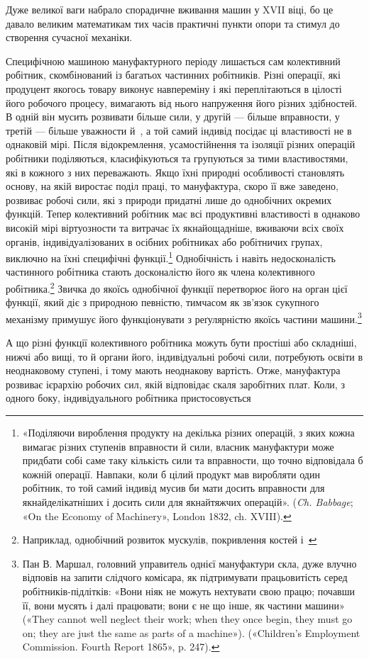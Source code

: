 \parcont{}  %
Дуже великої ваги набрало спорадичне вживання машин у
XVII віці, бо це давало великим математикам тих часів практичні
пункти опори та стимул до створення сучасної механіки.

Специфічною машиною мануфактурного періоду лишається
сам колективний робітник, скомбінований із багатьох частинних
робітників. Різні операції, які продуцент якогось товару виконує
навпереміну і які переплітаються в цілості його робочого процесу,
вимагають від нього напруження його різних здібностей.
В одній він мусить розвивати більше сили, у другій — більше
вправности, у третій — більше уважности й~, а той самий
індивід посідає ці властивості не в однаковій мірі. Після відокремлення,
усамостійнення та ізоляції різних операцій робітники
поділяються, класифікуються та групуються за тими властивостями,
які в кожного з них переважають. Якщо їхні природні
особливості становлять основу, на якій виростає поділ праці,
то мануфактура, скоро її вже заведено, розвиває робочі сили, які
з природи придатні лише до однобічних окремих функцій. Тепер
колективний робітник має всі продуктивні властивості в однаково
високій мірі віртуозности та витрачає їх якнайощадніше, вживаючи
всіх своїх органів, індивідуалізованих в осібних робітниках
або робітничих групах, виключно на їхні специфічні функції.\footnote{
«Поділяючи вироблення продукту на декілька різних операцій,
з яких кожна вимагає різних ступенів вправности й сили, власник мануфактури
може придбати собі саме таку кількість сили та вправности,
що точно відповідала б кожній операції. Навпаки, коли б цілий продукт
мав виробляти один робітник, то той самий індивід мусив би мати досить
вправности для якнайделікатніших і досить сили для якнайтяжчих
операцій». (\emph{Ch. Babbage}; «On the Economy of Machinery», London 1832,
ch. XVIII).
} Однобічність і навіть недосконалість частинного робітника стають
досконалістю його як члена колективного робітника.\footnote{
Наприклад, однобічний розвиток мускулів, покривлення костей
і~
} Звичка до якоїсь однобічної функції перетворює його на орган цієї
функції, який діє з природною певністю, тимчасом як зв’язок
сукупного механізму примушує його функціонувати з реґулярністю
якоїсь частини машини.\footnote{
Пан В. Маршал, головний управитель однієї мануфактури скла,
дуже влучно відповів на запити слідчого комісара, як підтримувати
працьовитість серед робітників-підлітків: «Вони ніяк не можуть нехтувати
свою працю; почавши її, вони мусять і далі працювати; вони
є не що інше, як частини машини» («They cannot well neglect their work;
when they once begin, they must go on; they are just the same as parts of
a machine»). («Children’s Employment Commission. Fourth Report 1865»,
p. 247).
}

А що різні функції колективного робітника можуть бути
простіші або складніші, нижчі або вищі, то й органи його, індивідуальні
робочі сили, потребують освіти в неоднаковому ступені,
і тому мають неоднакову вартість. Отже, мануфактура розвиває
ієрархію робочих сил, якій відповідає скаля заробітних плат.
Коли, з одного боку, індивідуального робітника пристосовується
\parbreak{}  %
